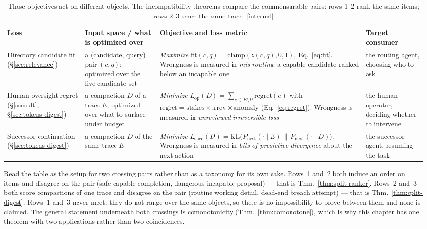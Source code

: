 \documentclass[11pt,a4paper]{article}
\theoremstyle{definition}
\theoremstyle{plain}
\begin{document}
\begin{table}[H]
\centering
\caption{These objectives act on different objects. The incompatibility theorems compare the commensurable pairs: rows 1--2 rank the same items; rows 2--3 score the same trace. [internal]}
\label{tab:ls-three-losses}
\small
\renewcommand{\arraystretch}{1.3}
\begin{tabularx}{\linewidth}{@{}p{} >{\raggedright\arraybackslash}X >{\raggedright\arraybackslash}X >{\raggedright\arraybackslash}p{}@{}}
\toprule
\textbf{Loss} & \textbf{Input space / what is optimized over} & \textbf{Objective and loss metric} & \textbf{Target consumer} \\
\midrule
Directory candidate fit \newline (\S\ref{sec:relevance})
& a (candidate, query) pair $(c,q)$; optimized over the live candidate set
& \emph{Maximize} $\mathrm{fit}(c,q)=\mathrm{clamp}(z(c,q),0,1)$,
Eq.~\ref{eq:fit}. Wrongness is measured in \emph{mis-routing}: a capable
candidate ranked below an incapable one
& the routing agent, choosing who to ask \\
Human oversight regret \newline (\S\ref{sec:sdt}, \S\ref{sec:tokens-digest})
& a compaction $D$ of a trace $E$; optimized over what to surface under budget
& \emph{Minimize} $L_{\mathrm{op}}(D)=\sum_{e\in E\setminus D}\mathrm{regret}(e)$
with $\mathrm{regret}=\mathrm{stakes}\times\mathrm{irrev}\times\mathrm{anomaly}$
(Eq.~\ref{eq:regret}). Wrongness is measured in \emph{unreviewed
irreversible loss}
& the human operator, deciding whether to intervene \\
Successor continuation \newline (\S\ref{sec:tokens-digest})
& a compaction $D$ of the same trace $E$
& \emph{Minimize}
$L_{\mathrm{succ}}(D)=\mathrm{KL}\bigl(P_{\mathrm{next}}(\cdot\mid E)\,\|\,P_{\mathrm{next}}(\cdot\mid D)\bigr)$.
Wrongness is measured in \emph{bits of predictive divergence} about the next
action
& the successor agent, resuming the task \\
\bottomrule
\end{tabularx}
\end{table}

\noindent Read the table as the setup for two crossing pairs rather than as a
taxonomy for its own sake. Rows~1 and~2 both induce an order on items and
disagree on the pair (safe capable completion, dangerous incapable proposal) ---
that is Thm.~\ref{thm:split-ranker}. Rows~2 and~3 both score compactions of one
trace and disagree on the pair (routine working detail, dead-end breach
attempt) --- that is Thm.~\ref{thm:split-digest}. Rows~1 and~3 never meet: they
do not range over the same objects, so there is no impossibility to prove
between them and none is claimed. The general statement underneath both
crossings is comonotonicity (Thm.~\ref{thm:comonotone}), which is why this
chapter has one theorem with two applications rather than two coincidences.
\end{document}

